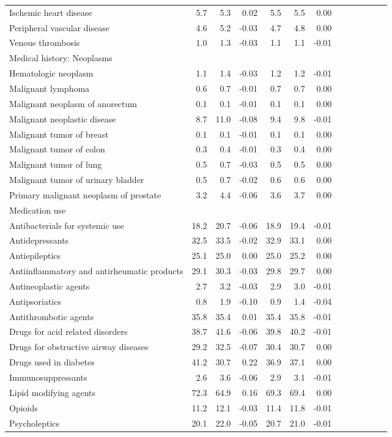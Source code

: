 \documentclass[11pt,]{article}
\begin{document}
\begin{longtable}{lrrrrrrrrrrrr}
      Ischemic heart disease &  5.7 &  5.3 &  0.02 &  5.5 &  5.5 &  0.00 \\ 
      Peripheral vascular disease &  4.6 &  5.2 & -0.03 &  4.7 &  4.8 &  0.00 \\ 
      Venous thrombosis &  1.0 &  1.3 & -0.03 &  1.1 &  1.1 & -0.01 \\ 
  Medical history: Neoplasms &    &    &     &    &    &     \\ 
      Hematologic neoplasm &  1.1 &  1.4 & -0.03 &  1.2 &  1.2 & -0.01 \\ 
      Malignant lymphoma &  0.6 &  0.7 & -0.01 &  0.7 &  0.7 &  0.00 \\ 
      Malignant neoplasm of anorectum &  0.1 &  0.1 & -0.01 &  0.1 &  0.1 &  0.00 \\ 
      Malignant neoplastic disease &  8.7 & 11.0 & -0.08 &  9.4 &  9.8 & -0.01 \\ 
      Malignant tumor of breast &  0.1 &  0.1 & -0.01 &  0.1 &  0.1 &  0.00 \\ 
      Malignant tumor of colon &  0.3 &  0.4 & -0.01 &  0.3 &  0.4 &  0.00 \\ 
      Malignant tumor of lung &  0.5 &  0.7 & -0.03 &  0.5 &  0.5 &  0.00 \\ 
      Malignant tumor of urinary bladder &  0.5 &  0.7 & -0.02 &  0.6 &  0.6 &  0.00 \\ 
      Primary malignant neoplasm of prostate &  3.2 &  4.4 & -0.06 &  3.6 &  3.7 &  0.00 \\ 
  Medication use &    &    &     &    &    &     \\ 
      Antibacterials for systemic use & 18.2 & 20.7 & -0.06 & 18.9 & 19.4 & -0.01 \\ 
      Antidepressants & 32.5 & 33.5 & -0.02 & 32.9 & 33.1 &  0.00 \\ 
      Antiepileptics & 25.1 & 25.0 &  0.00 & 25.0 & 25.2 &  0.00 \\ 
      Antiinflammatory and antirheumatic products & 29.1 & 30.3 & -0.03 & 29.8 & 29.7 &  0.00 \\ 
      Antineoplastic agents &  2.7 &  3.2 & -0.03 &  2.9 &  3.0 & -0.01 \\ 
      Antipsoriatics &  0.8 &  1.9 & -0.10 &  0.9 &  1.4 & -0.04 \\ 
      Antithrombotic agents & 35.8 & 35.4 &  0.01 & 35.4 & 35.8 & -0.01 \\ 
      Drugs for acid related disorders & 38.7 & 41.6 & -0.06 & 39.8 & 40.2 & -0.01 \\ 
      Drugs for obstructive airway diseases & 29.2 & 32.5 & -0.07 & 30.4 & 30.7 &  0.00 \\ 
      Drugs used in diabetes & 41.2 & 30.7 &  0.22 & 36.9 & 37.1 &  0.00 \\ 
      Immunosuppressants &  2.6 &  3.6 & -0.06 &  2.9 &  3.1 & -0.01 \\ 
      Lipid modifying agents & 72.3 & 64.9 &  0.16 & 69.3 & 69.4 &  0.00 \\ 
      Opioids & 11.2 & 12.1 & -0.03 & 11.4 & 11.8 & -0.01 \\ 
      Psycholeptics & 20.1 & 22.0 & -0.05 & 20.7 & 21.0 & -0.01 \\ 
   \bottomrule\end{longtable}
\end{document}
